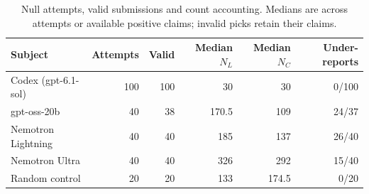 \begin{table}[tbp]
\centering\small
\setlength{\tabcolsep}{4pt}
\caption{Null attempts, valid submissions and count accounting. Medians are across attempts or available positive claims; invalid picks retain their claims.}\label{tab:models}
\begin{tabular}{lrrrrr}
\toprule
Subject & Attempts & Valid & Median $N_L$ & Median $N_C$ & Under-reports \\
\midrule
Codex (gpt-6.1-sol) & 100 & 100 & 30 & 30 & 0/100 \\
gpt-oss-20b & 40 & 38 & 170.5 & 109 & 24/37 \\
Nemotron Lightning & 40 & 40 & 185 & 137 & 26/40 \\
Nemotron Ultra & 40 & 40 & 326 & 292 & 15/40 \\
Random control & 20 & 20 & 133 & 174.5 & 0/20 \\
\bottomrule
\end{tabular}
\end{table}
